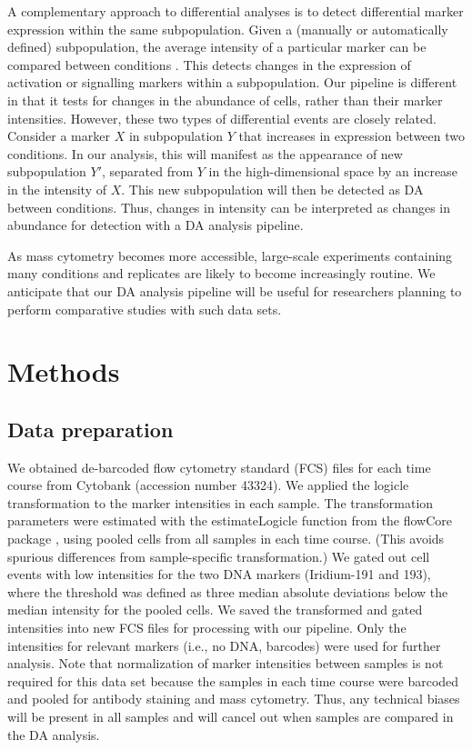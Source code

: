 \documentclass{article}
\begin{document}
A complementary approach to differential analyses is to detect differential marker expression within the same subpopulation.
Given a (manually or automatically defined) subpopulation, the average intensity of a particular marker can be compared between conditions \cite{anchang2016visualization,behbehani2015mass}.
This detects changes in the expression of activation or signalling markers within a subpopulation.
Our pipeline is different in that it tests for changes in the abundance of cells, rather than their marker intensities.
However, these two types of differential events are closely related.
Consider a marker $X$ in subpopulation $Y$ that increases in expression between two conditions. 
In our analysis, this will manifest as the appearance of new subpopulation $Y'$, separated from $Y$ in the high-dimensional space by an increase in the intensity of $X$.
This new subpopulation will then be detected as DA between conditions.
Thus, changes in intensity can be interpreted as changes in abundance for detection with a DA analysis pipeline.

As mass cytometry becomes more accessible, large-scale experiments containing many conditions and replicates are likely to become increasingly routine.
We anticipate that our DA analysis pipeline will be useful for researchers planning to perform comparative studies with such data sets.


\section{Methods}

\subsection{Data preparation}
We obtained de-barcoded flow cytometry standard (FCS) files for each time course from Cytobank \cite{kotecha2010web} (accession number 43324).
We applied the logicle transformation \cite{parks2006new} to the marker intensities in each sample.
The transformation parameters were estimated with the estimateLogicle function from the flowCore package \cite{hahne2009flowcore}, using pooled cells from all samples in each time course.
(This avoids spurious differences from sample-specific transformation.)
We gated out cell events with low intensities for the two DNA markers (Iridium-191 and 193), where the threshold was defined as three median absolute deviations below the median intensity for the pooled cells.
We saved the transformed and gated intensities into new FCS files for processing with our pipeline.
Only the intensities for relevant markers (i.e., no DNA, barcodes) were used for further analysis.
Note that normalization of marker intensities between samples is not required for this data set because the samples in each time course were barcoded and pooled for antibody staining and mass cytometry.
Thus, any technical biases will be present in all samples and will cancel out when samples are compared in the DA analysis.
\end{document}
